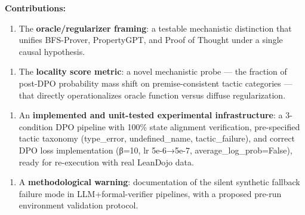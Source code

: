 \textbf{Contributions:}

\begin{enumerate}
\item The \textbf{oracle/regularizer framing}: a testable mechanistic distinction that unifies BFS-Prover, PropertyGPT, and Proof of Thought under a single causal hypothesis.
\end{enumerate}

\begin{enumerate}
\item The \textbf{locality score metric}: a novel mechanistic probe — the fraction of post-DPO probability mass shift on premise-consistent tactic categories — that directly operationalizes oracle function versus diffuse regularization.
\end{enumerate}

\begin{enumerate}
\item An \textbf{implemented and unit-tested experimental infrastructure}: a 3-condition DPO pipeline with 100\% state alignment verification, pre-specified tactic taxonomy (type_error, undefined_name, tactic_failure), and correct DPO loss implementation (β=10, lr 5e-6→5e-7, average_log_prob=False), ready for re-execution with real LeanDojo data.
\end{enumerate}

\begin{enumerate}
\item A \textbf{methodological warning}: documentation of the silent synthetic fallback failure mode in LLM+formal-verifier pipelines, with a proposed pre-run environment validation protocol.
\end{enumerate}

